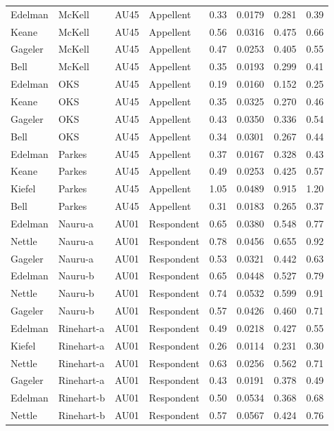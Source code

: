 \documentclass{monashthesis}
\begin{document}
\begin{center}
\begin{longtable}{llllllll}
Edelman & McKell & AU45 & Appellent & 0.33 & 0.0179 & 0.281 & 0.39 \\
Keane & McKell & AU45 & Appellent & 0.56 & 0.0316 & 0.475 & 0.66 \\
Gageler & McKell & AU45 & Appellent & 0.47 & 0.0253 & 0.405 & 0.55 \\
Bell & McKell & AU45 & Appellent & 0.35 & 0.0193 & 0.299 & 0.41 \\
Edelman & OKS & AU45 & Appellent & 0.19 & 0.0160 & 0.152 & 0.25 \\
Keane & OKS & AU45 & Appellent & 0.35 & 0.0325 & 0.270 & 0.46 \\
Gageler & OKS & AU45 & Appellent & 0.43 & 0.0350 & 0.336 & 0.54 \\
Bell & OKS & AU45 & Appellent & 0.34 & 0.0301 & 0.267 & 0.44 \\
Edelman & Parkes & AU45 & Appellent & 0.37 & 0.0167 & 0.328 & 0.43 \\
Keane & Parkes & AU45 & Appellent & 0.49 & 0.0253 & 0.425 & 0.57 \\
Kiefel & Parkes & AU45 & Appellent & 1.05 & 0.0489 & 0.915 & 1.20 \\
Bell & Parkes & AU45 & Appellent & 0.31 & 0.0183 & 0.265 & 0.37 \\
Edelman & Nauru-a & AU01 & Respondent & 0.65 & 0.0380 & 0.548 & 0.77 \\
Nettle & Nauru-a & AU01 & Respondent & 0.78 & 0.0456 & 0.655 & 0.92 \\
Gageler & Nauru-a & AU01 & Respondent & 0.53 & 0.0321 & 0.442 & 0.63 \\
Edelman & Nauru-b & AU01 & Respondent & 0.65 & 0.0448 & 0.527 & 0.79 \\
Nettle & Nauru-b & AU01 & Respondent & 0.74 & 0.0532 & 0.599 & 0.91 \\
Gageler & Nauru-b & AU01 & Respondent & 0.57 & 0.0426 & 0.460 & 0.71 \\
Edelman & Rinehart-a & AU01 & Respondent & 0.49 & 0.0218 & 0.427 & 0.55 \\
Kiefel & Rinehart-a & AU01 & Respondent & 0.26 & 0.0114 & 0.231 & 0.30 \\
Nettle & Rinehart-a & AU01 & Respondent & 0.63 & 0.0256 & 0.562 & 0.71 \\
Gageler & Rinehart-a & AU01 & Respondent & 0.43 & 0.0191 & 0.378 & 0.49 \\
Edelman & Rinehart-b & AU01 & Respondent & 0.50 & 0.0534 & 0.368 & 0.68 \\
Nettle & Rinehart-b & AU01 & Respondent & 0.57 & 0.0567 & 0.424 & 0.76 \\

\end{longtable}
\end{center}
\end{document}
